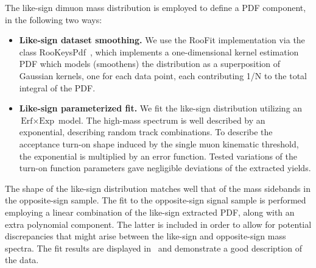 The like-sign dimuon mass distribution is employed to define a PDF component, in the following two ways: 
\begin{itemize} 
\item {\bf{Like-sign dataset smoothing.}} 
We use the RooFit implementation via the class RooKeysPdf~\cite{rookeyspdf}, which implements a one-dimensional kernel estimation PDF which models (smoothens) the distribution %
as a superposition of Gaussian kernels, one for each data point, each contributing 1/N to the total integral of the PDF.  

\item {\bf{Like-sign parameterized fit.}} 
We fit the like-sign distribution utilizing an $\text{Erf} \times \text{Exp}$ model. 
The high-mass spectrum is well described by an exponential,  
describing random track combinations. 
To describe the acceptance turn-on shape induced by the single muon kinematic threshold, 
the exponential is multiplied by an error function. 
Tested variations of the turn-on function parameters gave negligible deviations of the extracted yields. 
\end{itemize} 

The shape of the like-sign distribution matches well that of the mass sidebands in the opposite-sign sample. 
The fit to the opposite-sign signal sample is performed employing a linear combination of the like-sign extracted PDF,  along with an extra polynomial component. The latter is included in order to allow for potential discrepancies that might arise between the like-sign and opposite-sign mass spectra.
The fit results are displayed in~ 
and demonstrate a good description of the data. 


